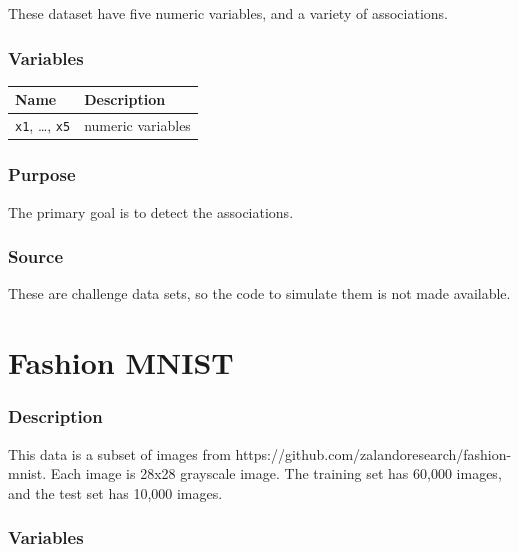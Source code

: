 \documentclass[
  letterpaper,
]{krantz}
\newcounter{none} %
\begin{document}
These dataset have five numeric variables, and a variety of
associations.

\subsubsection*{Variables}\label{variables-13}

{\def\LTcaptype{none} %
\begin{longtable}[]{@{}ll@{}}
\toprule\noalign{}
Name & Description \\
\midrule\noalign{}
\endhead
\bottomrule\noalign{}
\endlastfoot
\texttt{x1}, \ldots, \texttt{x5} & numeric variables \\
\end{longtable}
}

\subsubsection*{Purpose}\label{purpose-13}

The primary goal is to detect the associations.

\subsubsection*{Source}\label{source-13}

These are challenge data sets, so the code to simulate them is not made
available.

\section{Fashion MNIST}\label{fashion-mnist}

\subsubsection*{Description}\label{description-14}

This data is a subset of images from
https://github.com/zalandoresearch/fashion-mnist. Each image is 28x28
grayscale image. The training set has 60,000 images, and the test set
has 10,000 images.

\subsubsection*{Variables}\label{variables-14}
\end{document}
